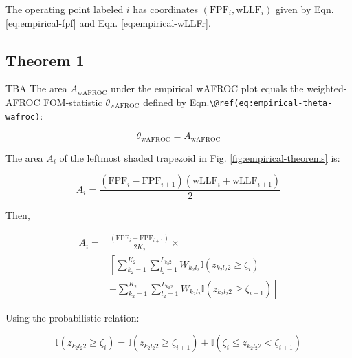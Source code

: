 \documentclass[
]{book}
\begin{document}
The operating point labeled \(i\) has coordinates \(\left ( \text{FPF}_i, \text{wLLF}_i \right )\) given by Eqn. \eqref{eq:empirical-fpf} and Eqn. \eqref{eq:empirical-wLLFr}.

\hypertarget{empirical-two-theorems-1}{%
\subsection{Theorem 1}\label{empirical-two-theorems-1}}

TBA The area \(A_{\text{wAFROC}}\) under the empirical wAFROC plot equals the weighted-AFROC FOM-statistic \(\theta_{\text{wAFROC}}\) defined by Eqn.\texttt{\textbackslash{}@ref(eq:empirical-theta-wafroc)}:

\begin{equation}
\theta_{\text{wAFROC}} = A_{\text{wAFROC}}
\label{eq:empirical-theorem1}
\end{equation}

The area \(A_i\) of the leftmost shaded trapezoid in Fig. \ref{fig:empirical-theorems} is:

\begin{equation}
A_i = \frac{\left (\text{FPF}_i - \text{FPF}_{i+1}\right )\left (\text{wLLF}_i + \text{wLLF}_{i+1}\right )}{2}
\label{eq:empirical-auc-1}
\end{equation}

Then,

\begin{equation}
\begin{aligned}
A_i =&  \frac{\left (\text{FPF}_i - \text{FPF}_{i+1}\right )}{2K_2} \times \\ 
& \left[ \sum_{k_2=1}^{K_2}\sum_{l_2=1}^{L_{k_2 2}}W_{k_2 l_2} \mathbb{I}\left ( z_{k_2 l_2 2} \geq \zeta_i \right ) \right. \\
&+ \left. \sum_{k_2=1}^{K_2}\sum_{l_2=1}^{L_{k_2 2}}W_{k_2 l_2} \mathbb{I}\left ( z_{k_2 l_2 2} \geq \zeta_{i+1} \right ) \right]  
\end{aligned}
\label{eq:empirical-theorem2}
\end{equation}

Using the probabilistic relation:

\begin{equation}
\mathbb{I}\left ( z_{k_2 l_2 2} \geq \zeta_i \right ) = \mathbb{I}\left ( z_{k_2 l_2 2} \geq \zeta_{i+1} \right ) + \mathbb{I}\left ( \zeta_{i} \leq z_{k_2 l_2 2} < \zeta_{i+1} \right )
\label{eq:empirical-appendix-1}
\end{equation}
\end{document}
